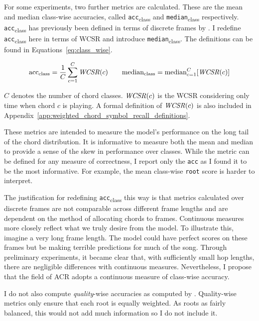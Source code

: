 For some experiments, two further metrics are calculated. These are the mean and median class-wise accuracies, called \texttt{acc}\textsubscript{class} and \texttt{median}\textsubscript{class} respectively. \texttt{acc}\textsubscript{class} has previously been defined in terms of discrete frames by \citet{ACRLargeVocab1}. I redefine \texttt{acc}\textsubscript{class} here in terms of WCSR and introduce \texttt{median}\textsubscript{class}. The definitions can be found in Equations~\ref{eq:class_wise}.

\begin{equation}\label{eq:class_wise}
    \text{acc}\textsubscript{class} = \frac{1}{C} \sum_{c=1}^{C} \text{\emph{WCSR}}(c)
\quad \quad
    \text{median}\textsubscript{class} = \text{median}_{c=1}^{C} [\text{\emph{WCSR}}(c)]
\end{equation}

$C$ denotes the number of chord classes. $\text{\emph{WCSR}}(c)$ is the WCSR considering only time when chord $c$ is playing. A formal definition of $\text{\emph{WCSR}}(c)$ is also included in Appendix~\ref{app:weighted_chord_symbol_recall_definitions}.

These metrics are intended to measure the model's performance on the long tail of the chord distribution. It is informative to measure both the mean and median to provide a sense of the skew in performance over classes. While the metric can be defined for any measure of correctness, I report only the \texttt{acc} as I found it to be the most informative. For example, the mean class-wise \texttt{root} score is harder to interpret.

The justification for redefining \texttt{acc}\textsubscript{class} this way is that metrics calculated over discrete frames are not comparable across different frame lengths and are dependent on the method of allocating chords to frames. Continuous measures more closely reflect what we truly desire from the model. To illustrate this, imagine a very long frame length. The model could have perfect scores on these frames but be making terrible predictions for much of the song. Through preliminary experiments, it became clear that, with sufficiently small hop lengths, there are negligible differences with continuous measures. Nevertheless, I propose that the field of ACR adopts a continuous measure of class-wise accuracy.

I do not also compute \emph{quality}-wise accuracies as computed by \citet{CurriculumLearning}. Quality-wise metrics only ensure that each root is equally weighted. As roots as fairly balanced, this would not add much information so I do not include it.

